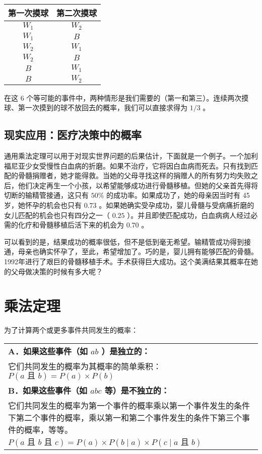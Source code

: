 \begin{center}
\begin{tabular}{|c|c|}
\hline
\textbf{第一次摸球} & \textbf{第二次摸球} \\
\hline
$W_{1}$ & $W_{2}$ \\
$W_{1}$ & $B$ \\
$W_{2}$ & $W_{1}$ \\
$W_{2}$ & $B$ \\
$B$ & $W_{1}$ \\
$B$ & $W_{2}$ \\
\hline
\end{tabular}
\end{center}

在这 6 个等可能的事件中，两种情形是我们需要的（第一和第三）。连续两次摸球、第一次摸到的球不放回去的概率，我们可以直接求得为 $1 / 3$ 。

\subsection{现实应用：医疗决策中的概率}

通用乘法定理可以用于对现实世界问题的后果估计，下面就是一个例子。一个加利福尼亚少女受慢性白血病的折磨。如果不治疗，它将因白血病而死去。只有找到匹配的骨髓捐赠者，她才能得救。当她的父母寻找这样的捐赠人的所有努力均失败之后，他们决定再生一个小孩，以希望能够成功进行骨髓移植。但她的父亲首先得将切断的输精管接通，这只有 $50\%$ 的成功率。如果成功了，她的母亲因当时有 45 岁，她怀孕的机会也只有 $0.73$ 。如果她确实受孕成功，婴儿骨髓与受病痛折磨的女儿匹配的机会也只有四分之一（ $0.25$ ）。并且即使匹配成功，白血病病人经过必需的化疗和骨髓移植后活下来的机会为 $0.70$ 。

可以看到的是，结果成功的概率很低，但不是低到毫无希望。输精管成功得到接通，母亲也确实怀孕了，至此，希望增加了。巧的是，婴儿拥有能够匹配的骨髓。1992年进行了艰巨的骨髓移植手术。手术获得巨大成功\cite{ayala1993}。这个美满结果其概率在她的父母做决策的时候有多大呢？

\section*{乘法定理}
为了计算两个或更多事件共同发生的概率：

\begin{center}
\begin{tabular}{|p{}|}
\hline
\textbf{A．如果这些事件（如 $a$\zhtext{、}$b$ ）是独立的：} \\
它们共同发生的概率为其概率的简单乘积：
$P(a \text { 且 } b)=P(a) \times P(b)$ \\
\hline
\textbf{B．如果这些事件（如 $a$\zhtext{、}$b$\zhtext{、}$c$ 等）是不独立的：} \\
它们共同发生的概率为第一个事件的概率乘以第一个事件发生的条件下第二个事件的概率，乘以第一和第二个事件发生的条件下第三个事件的概率，等等。 \\
$P(a \text{ 且 } b \text{ 且 } c)=P(a) \times P(b \mid a) \times P(c \mid a \text{ 且 } b)$ \\
\hline
\end{tabular}
\end{center}

